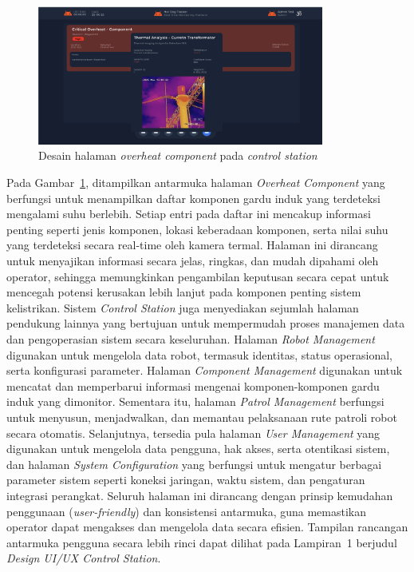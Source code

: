 \begin{figure}[H]
  \centering
  \includegraphics[width=0.84\textwidth]{gambar/bab3/overheat.png}
  \caption{Desain halaman \emph{overheat component} pada \emph{control station}}
  \label{fig:control-station-overheat}
\end{figure}


Pada Gambar~\ref{fig:control-station-overheat}, ditampilkan antarmuka halaman \emph{Overheat Component} yang berfungsi untuk menampilkan daftar komponen gardu induk yang terdeteksi mengalami suhu berlebih. Setiap entri pada daftar ini mencakup informasi penting seperti jenis komponen, lokasi keberadaan komponen, serta nilai suhu yang terdeteksi secara real-time oleh kamera termal. Halaman ini dirancang untuk menyajikan informasi secara jelas, ringkas, dan mudah dipahami oleh operator, sehingga memungkinkan pengambilan keputusan secara cepat untuk mencegah potensi kerusakan lebih lanjut pada komponen penting sistem kelistrikan. 
Sistem \emph{Control Station} juga menyediakan sejumlah halaman pendukung lainnya yang bertujuan untuk mempermudah proses manajemen data dan pengoperasian sistem secara keseluruhan. Halaman \emph{Robot Management} digunakan untuk mengelola data robot, termasuk identitas, status operasional, serta konfigurasi parameter. Halaman \emph{Component Management} digunakan untuk mencatat dan memperbarui informasi mengenai komponen-komponen gardu induk yang dimonitor. Sementara itu, halaman \emph{Patrol Management} berfungsi untuk menyusun, menjadwalkan, dan memantau pelaksanaan rute patroli robot secara otomatis. Selanjutnya, tersedia pula halaman \emph{User Management} yang digunakan untuk mengelola data pengguna, hak akses, serta otentikasi sistem, dan halaman \emph{System Configuration} yang berfungsi untuk mengatur berbagai parameter sistem seperti koneksi jaringan, waktu sistem, dan pengaturan integrasi perangkat. Seluruh halaman ini dirancang dengan prinsip kemudahan penggunaan (\emph{user-friendly}) dan konsistensi antarmuka, guna memastikan operator dapat mengakses dan mengelola data secara efisien. Tampilan rancangan antarmuka pengguna secara lebih rinci dapat dilihat pada Lampiran~1 berjudul \emph{Design UI/UX Control Station}.



